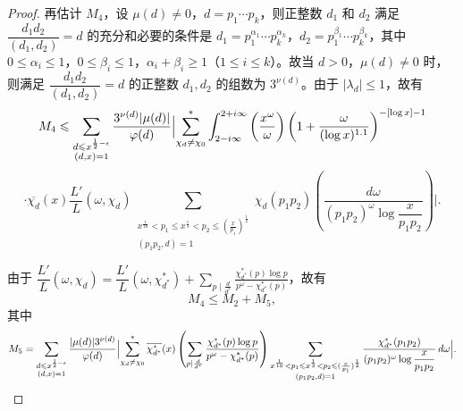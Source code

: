 \begin{proof}
再估计 $M_4$，设 $\mu(d)\neq0$，$d=p_1\cdots p_k$，则正整数 $d_1$ 和 $d_2$ 满足 $\dfrac{d_1d_2}{(d_1,d_2)}=d$ 的充分和必要的条件是 $d_1=p_1^{\alpha_1}\cdots p_k^{\alpha_k}$，$d_2=p_1^{\beta_1}\cdots p_k^{\beta_k}$，其中 $0\leqslant\alpha_i\leqslant1$，$0\leqslant\beta_i\leqslant1$，$\alpha_i+\beta_i\geqslant1$（$1\leqslant i\leqslant k$）。故当 $d>0$，$\mu(d)\neq0$ 时，则满足 $\dfrac{d_1d_2}{(d_1,d_2)}=d$ 的正整数 $d_1,d_2$ 的组数为 $3^{\nu(d)}$。由于 $|\lambda_d|\leqslant1$，故有
\[
M_4\leqslant\sum_{\substack{d\leqslant x^{\frac12-\epsilon}\\(d,x)=1}}\frac{3^{\nu(d)}|\mu(d)|}{\varphi(d)}
\Bigl|\sum_{\chi_d\neq\chi_0}^{*}\int_{2-i\infty}^{2+i\infty}\left(\frac{x^\omega}{\omega}\right)\left(1+\frac{\omega}{(\log x)^{1.1}}\right)^{-[\log x]-1}
\]
\[
\cdot\overline{\chi_d}(x)\frac{L'}{L}(\omega,\chi_d)
\sum_{\substack{x^{\frac1{10}}<p_1\leqslant x^{\frac13}<p_2\leqslant(\frac{x}{p_1})^{\frac12}\\(p_1p_2,d)=1}}
\chi_d(p_1p_2)\left(\frac{d\omega}{(p_1p_2)^\omega\log\dfrac{x}{p_1p_2}}\right)\Bigr|.
\]

由于 $\dfrac{L'}{L}(\omega,\chi_d)=\dfrac{L'}{L}(\omega,\chi_{d^*}^*)+\displaystyle\sum_{p\mid\frac{d}{d^*}}\frac{\chi_{d^*}^*(p)\log p}{p^\omega-\chi_{d^*}^*(p)}$，故有
\begin{equation}\label{eq:chen9}
M_4\leqslant M_2+M_5,
\end{equation}
其中
\[
M_5=\sum_{\substack{d\leqslant x^{\frac12-\epsilon}\\(d,x)=1}}\frac{|\mu(d)|3^{\nu(d)}}{\varphi(d)}
\Bigl|\sum_{\chi_d\neq\chi_0}^{*}\overline{\chi_{d^*}^*}(x)
\left(\sum_{p\mid\frac{d}{d^*}}\frac{\chi_{d^*}^*(p)\log p}{p^\omega-\chi_{d^*}^*(p)}\right)
\sum_{\substack{x^{\frac1{10}}<p_1\leqslant x^{\frac13}<p_2\leqslant(\frac{x}{p_1})^{\frac12}\\(p_1p_2,d)=1}}
\frac{\chi_{d^*}^*(p_1p_2)}{(p_1p_2)^\omega\log\dfrac{x}{p_1p_2}}\,d\omega\Bigr|.
\]


\end{proof}
